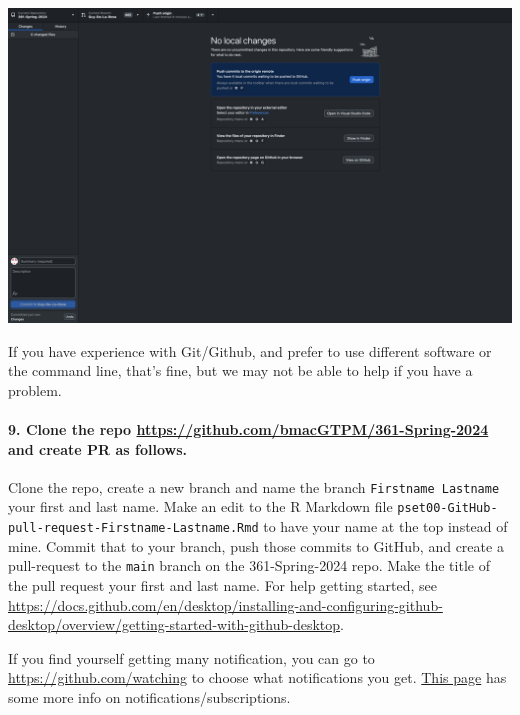 \documentclass[
]{article}
\begin{document}
\includegraphics{img/snip of GitHub Desktop.png}

If you have experience with Git/Github, and prefer to use different
software or the command line, that's fine, but we may not be able to
help if you have a problem.

\hypertarget{clone-the-repo-httpsgithub.combmacgtpm361-spring-2024-and-create-pr-as-follows.}{%
\paragraph{\texorpdfstring{9. Clone the repo
\url{https://github.com/bmacGTPM/361-Spring-2024} and create PR as
follows.}{9. Clone the repo https://github.com/bmacGTPM/361-Spring-2024 and create PR as follows.}}\label{clone-the-repo-httpsgithub.combmacgtpm361-spring-2024-and-create-pr-as-follows.}}

Clone the repo, create a new branch and name the branch
\texttt{Firstname\ Lastname} your first and last name. Make an edit to
the R Markdown file
\texttt{pset00-GitHub-pull-request-Firstname-Lastname.Rmd} to have your
name at the top instead of mine. Commit that to your branch, push those
commits to GitHub, and create a pull-request to the \texttt{main} branch
on the 361-Spring-2024 repo. Make the title of the pull request your
first and last name. For help getting started, see
\url{https://docs.github.com/en/desktop/installing-and-configuring-github-desktop/overview/getting-started-with-github-desktop}.

If you find yourself getting many notification, you can go to
\url{https://github.com/watching} to choose what notifications you get.
\href{https://docs.github.com/en/account-and-profile/managing-subscriptions-and-notifications-on-github/managing-subscriptions-for-activity-on-github/managing-your-subscriptions}{This
page} has some more info on notifications/subscriptions.
\end{document}
